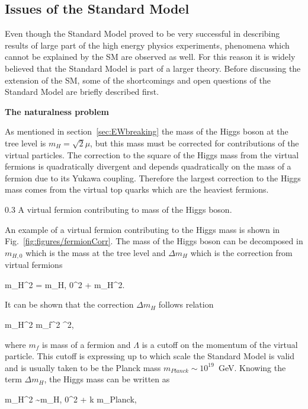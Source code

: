 \subsection{Issues of the Standard Model}

Even though the Standard Model proved to be very successful in describing results of large part of the high energy physics experiments, phenomena which cannot be explained by the SM are observed as well. For this reason it is widely believed that the Standard Model is part of a larger theory. Before discussing the extension of the SM, some of the shortcomings and open questions of the Standard Model are briefly described first.


\textbf{The naturalness problem}

As mentioned in section~\ref{sec:EWbreaking} the mass of the Higgs boson at the tree level is $m_{H} = \sqrt{2}\mu$, but this mass must be corrected for contributions of the virtual particles. The correction to the square of the Higgs mass from the virtual fermions is quadratically divergent and depends quadratically on the mass of a fermion due to its Yukawa coupling. Therefore the largest correction to the Higgs mass comes from the virtual top quarks which are the heaviest fermions.

                 {0.3}       %
                 { A virtual fermion contributing to mass of the Higgs boson. }

An example of a virtual fermion contributing to the Higgs mass is shown in Fig.~\ref{fig:figures/fermionCorr}. The mass of the Higgs boson can be decomposed in $m_{H,0}$ which is the mass at the tree level and $\Delta m_{H}$ which is the correction from virtual fermions

{
m_{H}^{2} = m_{H, 0}^{2} + \Delta m_{H}^{2}.
}

It can be shown that the correction $\Delta m_{H}$ follows relation

{
\Delta m_{H}^{2} \propto m_{f}^{2} \Lambda^2,
}

where $m_f$ is mass of a fermion and $\Lambda$ is a cutoff on the momentum of the virtual particle. This cutoff is expressing up to which scale the Standard Model is valid and is usually taken to be the Planck mass $m_{Planck} \sim  10^{19}$~GeV. Knowing the term $\Delta m_{H}$, the Higgs mass can be written as

{
m_{H}^{2} \sim m_{H, 0}^{2} + k  m_{Planck},
}

